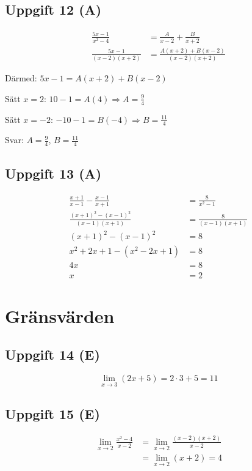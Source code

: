 \documentclass[12pt]{article}
\begin{document}
\subsection*{Uppgift 12 (A)}
\begin{facitbox}
\begin{align*}
\frac{5x - 1}{x^2 - 4} &= \frac{A}{x - 2} + \frac{B}{x + 2} \\
\frac{5x - 1}{(x - 2)(x + 2)} &= \frac{A(x + 2) + B(x - 2)}{(x - 2)(x + 2)}
\end{align*}

Därmed: $5x - 1 = A(x + 2) + B(x - 2)$

Sätt $x = 2$: $10 - 1 = A(4) \Rightarrow A = \frac{9}{4}$

Sätt $x = -2$: $-10 - 1 = B(-4) \Rightarrow B = \frac{11}{4}$

Svar: $A = \frac{9}{4}$, $B = \frac{11}{4}$
\end{facitbox}

\subsection*{Uppgift 13 (A)}
\begin{facitbox}
\begin{align*}
\frac{x + 1}{x - 1} - \frac{x - 1}{x + 1} &= \frac{8}{x^2 - 1} \\
\frac{(x + 1)^2 - (x - 1)^2}{(x - 1)(x + 1)} &= \frac{8}{(x - 1)(x + 1)} \\
(x + 1)^2 - (x - 1)^2 &= 8 \\
x^2 + 2x + 1 - (x^2 - 2x + 1) &= 8 \\
4x &= 8 \\
x &= 2
\end{align*}
\end{facitbox}

\section{Gränsvärden}

\subsection*{Uppgift 14 (E)}
\begin{facitbox}
\[
\lim_{x \to 3} (2x + 5) = 2 \cdot 3 + 5 = 11
\]
\end{facitbox}

\subsection*{Uppgift 15 (E)}
\begin{facitbox}
\begin{align*}
\lim_{x \to 2} \frac{x^2 - 4}{x - 2} &= \lim_{x \to 2} \frac{(x - 2)(x + 2)}{x - 2} \\
&= \lim_{x \to 2} (x + 2) = 4
\end{align*}
\end{facitbox}
\end{document}
